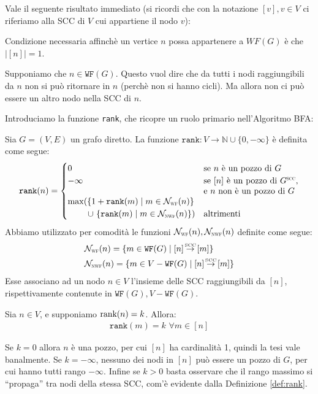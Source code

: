 Vale il seguente risultato immediato (si ricordi che con la notazione $[v], v \in V$ ci riferiamo alla SCC di $V$ cui appartiene il nodo $v$):
\begin{observation}
    Condizione necessaria affinchè un vertice $n$ possa appartenere a $WF(G)$ è che $|[n]| = 1$.
\end{observation}
\begin{proof2}
    Supponiamo che $n \in \texttt{WF}(G)$. Questo vuol dire che da tutti i nodi raggiungibili da $n$ non si può ritornare in $n$ (perchè non si hanno cicli). Ma allora non ci può essere un altro nodo nella SCC di $n$.
\end{proof2}

Introduciamo la funzione \texttt{rank}, che ricopre un ruolo primario nell'Algoritmo BFA:
\begin{definition}
    \label{def:rank}
    Sia $G = (V,E)$ un grafo diretto. La funzione $\texttt{rank}: V \to \mathbb{N} \cup \{0, -\infty\}$ è definita come segue:
    \begin{gather*}
        \texttt{rank}(n) = \begin{cases}
            0 &\text{se $n$ è un pozzo di $G$}\\
            -\infty &\parbox[t]{.32\textwidth}{se $[n]$ è un pozzo di $G^{\scalebox{.5}{SCC}}$,
                        e $n$ non è un pozzo di $G$}\\
            \max(\{1 + \texttt{rank}(m) \mid m \in \mathcal{N_{\scalebox{0.5}{WF}}}(n)\}\\
            \,\,\,\,\,\,\,\,\,\,\,\,\,\, \cup \,\, \{\texttt{rank}(m) \mid m \in \mathcal{N_{\scalebox{0.5}{NWF}}}(n)\}) &\text{altrimenti}
        \end{cases}
    \end{gather*}
    Abbiamo utilizzato per comodità le funzioni $\mathcal{N}_{\scalebox{0.5}{WF}}(n), \mathcal{N}_{\scalebox{0.5}{NWF}}(n)$ definite come segue:
    \begin{align*}
        &\mathcal{N}_{\scalebox{0.5}{WF}}(n) = \{m \in \texttt{WF}(G) \mid [n] \sccto [m]\}\\
        &\mathcal{N}_{\scalebox{0.5}{NWF}}(n) = \{m \in V - \texttt{WF}(G) \mid [n] \sccto [m]\}
    \end{align*}
    Esse associano ad un nodo $n \in V$ l'insieme delle SCC raggiungibili da $[n]$, rispettivamente contenute in $\texttt{WF}(G), V - \texttt{WF}(G)$.
\end{definition}
\begin{observation}
    Sia $n \in V$, e supponiamo $\textup{rank}(n) = k$. Allora:
    \begin{gather*}
        \texttt{rank}(m) = k \,\,\forall m \in [n]
    \end{gather*}
\end{observation}
\begin{proof2}
    Se $k = 0$ allora $n$ è una pozzo, per cui $[n]$ ha cardinalità 1, quindi la tesi vale banalmente. Se $k = -\infty$, nessuno dei nodi in $[n]$ può essere un pozzo di $G$, per cui hanno tutti rango $-\infty$. Infine se $k > 0$ basta osservare che il rango massimo si ``propaga'' tra nodi della stessa SCC, com'è evidente dalla Definizione \ref{def:rank}.
\end{proof2}

